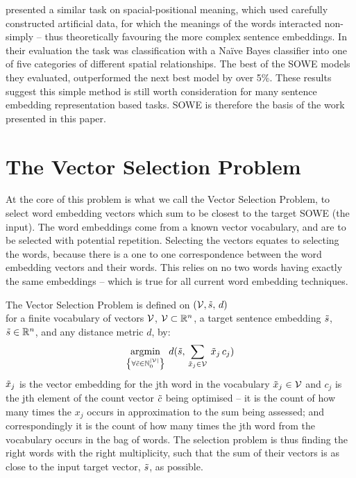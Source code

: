 \documentclass{book}
\begin{document}
\textcite{RitterPosition} presented a similar task on spacial-positional meaning, which used carefully constructed artificial data, for which the meanings of the words interacted non-simply -- thus theoretically favouring the more complex sentence embeddings. In their evaluation the task was classification with a Na{\"i}ve Bayes classifier into one of five categories of different spatial relationships. The best of the SOWE models they evaluated, outperformed the next best model by over 5\%. These results suggest this simple method is still worth consideration for many sentence embedding representation based tasks. SOWE is therefore the basis of the work presented in this paper.

\section{The Vector Selection Problem}\label{framework}

At the core of this problem is what we call the Vector Selection Problem, to select word embedding vectors which sum to be closest to the target SOWE (the input). The word embeddings come from a known vector vocabulary, and are to be selected with potential repetition.
Selecting the vectors equates to selecting the words, because there is a one to one correspondence between the word embedding vectors and their words. This relies on no two words having exactly the same embeddings -- which is true for all current word embedding techniques.

The Vector Selection Problem
	is defined on $(\mathcal{V}, \tilde{s},\,d)$ \\for a finite vocabulary of vectors $\mathcal{V}$, $\mathcal{V}\subset{\mathbb{R}}^{n}$, a target sentence embedding $ \tilde{s}$, $ \tilde{s}\in\mathbb{R}^{n}$, and any distance metric $d$, by:
		\[
		\operatorname*{argmin}_{\left\{ \forall\tilde{c}\in\mathbb{N}_{0}^{|\mathcal{V}|}\right\} }\:d( \tilde{s},\,\sum_{\tilde{x}_j\in\mathcal{V}}\:\tilde{x}_{j}\,c_{j})
		\]						
		$\tilde{x}_{j}$ is the vector embedding for the jth word in the vocabulary
		$\tilde{x}_{j}\in\mathcal{V}$ and $c_j$ is the jth element of the count vector $\tilde{c}$ being optimised -- it is the count of how many times the $x_j$ occurs in approximation to the sum being assessed; and correspondingly it is the count of how many times the jth word from the vocabulary occurs in the bag of words.
		The selection problem is thus finding the right words with the right multiplicity, such that the sum of their vectors is as close to the input target vector, $\tilde{s}$, as possible.
\end{document}
